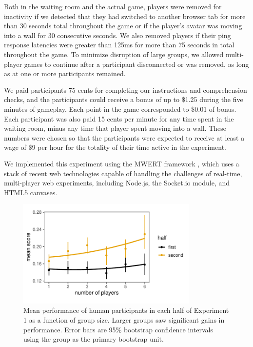 \documentclass[12pt,letterpaper]{article}
\begin{document}
Both in the waiting room and the actual game, players were removed for inactivity if we detected that they had switched to another browser tab for more than 30 seconds total throughout the game or if the player's avatar was moving into a wall for 30 consecutive seconds.  
We also removed players if their ping response latencies were greater than 125ms for more than 75 seconds in total throughout the game.  
To minimize disruption of large groups, we allowed multi-player games to continue after a participant disconnected or was removed, as long as at one or more participants remained.

We paid participants 75 cents for completing our instructions and comprehension checks, and the participants could receive a bonus of up to \$1.25 during the five minutes of gameplay. Each point in the game corresponded to \$0.01 of bonus. Each participant was also paid 15 cents per minute for any time spent in the waiting room, minus any time that player spent moving into a wall.  These numbers were chosen so that the participants were expected to receive at least a wage of \$9 per hour for the totality of their time active in the
experiment.

We implemented this experiment using the MWERT framework \cite{hawkins_conducting_2014}, which uses a stack of recent web technologies capable of handling the challenges of real-time, multi-player web experiments, including Node.js, the Socket.io module, and HTML5 canvases.  

\begin{figure}[t!]
  \centering
  \includegraphics[width=0.8\textwidth]{./figures/performance-summary-exp1.pdf}
  \caption{Mean performance of human participants in each half of Experiment 1 as a function of group size. Larger groups saw significant gains in performance. Error bars are 95\% bootstrap confidence intervals using the group as the primary bootstrap unit. }
  \label{fig:exp1_performance}
\end{figure}
\end{document}
